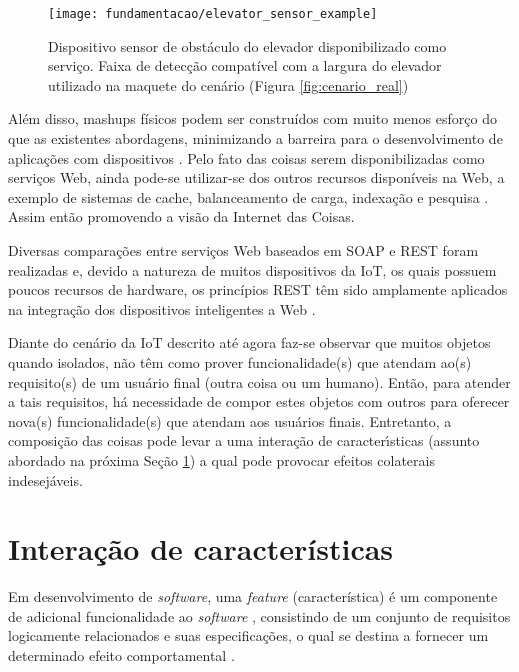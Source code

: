 \begin{figure}[!htb] \centering 
  \centering
  \texttt{[image: fundamentacao/elevator\_sensor\_example]} 
  \caption{Dispositivo sensor de obstáculo do elevador disponibilizado como serviço. Faixa de detecção compatível com a largura do elevador utilizado na maquete do cenário (Figura \ref{fig:cenario_real})} 
  \label{fig:dispnavegador}
\end{figure}

Além disso, mashups físicos\footnotemark {} podem ser construídos com muito menos esforço do que as existentes abordagens, minimizando a barreira para o desenvolvimento de aplicações com dispositivos \cite{Guinard:2009}. Pelo fato das coisas serem disponibilizadas como serviços Web, ainda pode-se utilizar-se dos outros recursos disponíveis na Web, a exemplo de sistemas de cache, balanceamento de carga, indexação e pesquisa \cite{Franca:2011}. Assim então promovendo a visão da Internet das Coisas.

Diversas comparações \cite{Mulligan:2009, Castillo:2011, Belqasmi:2012, Wagh:2012} entre serviços Web baseados em SOAP e REST foram realizadas e, devido a natureza de muitos dispositivos da IoT, os quais possuem poucos recursos de hardware, os princípios REST têm sido amplamente aplicados na integração dos dispositivos inteligentes a Web \cite{Franca:2011}.

Diante do cenário da IoT descrito até agora faz-se observar que muitos objetos quando isolados, não têm como prover funcionalidade(s) que atendam ao(s) requisito(s) de um usuário final (outra coisa ou um humano). Então, para atender a tais requisitos, há necessidade de compor estes objetos com outros para oferecer nova(s) funcionalidade(s) que atendam aos usuários finais. Entretanto, a composição das coisas pode levar a uma interação de caracterı́sticas (assunto abordado na próxima Seção \ref{sec:featureinteraction}) a qual pode provocar efeitos colaterais indesejáveis.

\section{Interação de características}
\label{sec:featureinteraction}
Em desenvolvimento de \textit{software}, uma \textit{feature} (característica) é um componente de adicional funcionalidade ao \textit{software} \cite{Calder:2003}, consistindo de um conjunto de requisitos logicamente relacionados e suas especificações, o qual se destina a fornecer um determinado efeito comportamental \cite{NHLABATSI:2008}.

